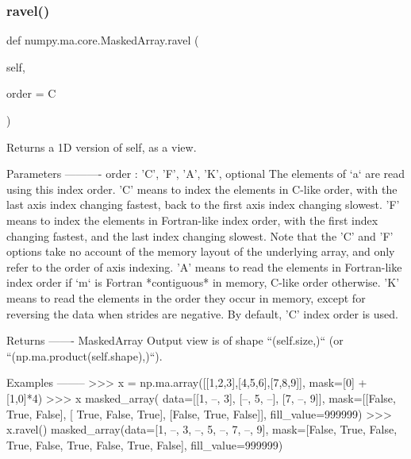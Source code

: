 \subsubsection{\texorpdfstring{ravel()}{ravel()}}
{\footnotesize\ttfamily def numpy.\+ma.\+core.\+Masked\+Array.\+ravel (\begin{DoxyParamCaption}\item[{}]{self,  }\item[{}]{order = {\ttfamily \textquotesingle{}C\textquotesingle{}} }\end{DoxyParamCaption})}

\begin{DoxyVerb}Returns a 1D version of self, as a view.

Parameters
----------
order : {'C', 'F', 'A', 'K'}, optional
    The elements of `a` are read using this index order. 'C' means to
    index the elements in C-like order, with the last axis index
    changing fastest, back to the first axis index changing slowest.
    'F' means to index the elements in Fortran-like index order, with
    the first index changing fastest, and the last index changing
    slowest. Note that the 'C' and 'F' options take no account of the
    memory layout of the underlying array, and only refer to the order
    of axis indexing.  'A' means to read the elements in Fortran-like
    index order if `m` is Fortran *contiguous* in memory, C-like order
    otherwise.  'K' means to read the elements in the order they occur
    in memory, except for reversing the data when strides are negative.
    By default, 'C' index order is used.

Returns
-------
MaskedArray
    Output view is of shape ``(self.size,)`` (or
    ``(np.ma.product(self.shape),)``).

Examples
--------
>>> x = np.ma.array([[1,2,3],[4,5,6],[7,8,9]], mask=[0] + [1,0]*4)
>>> x
masked_array(
  data=[[1, --, 3],
[--, 5, --],
[7, --, 9]],
  mask=[[False,  True, False],
[ True, False,  True],
[False,  True, False]],
  fill_value=999999)
>>> x.ravel()
masked_array(data=[1, --, 3, --, 5, --, 7, --, 9],
     mask=[False,  True, False,  True, False,  True, False,  True,
           False],
       fill_value=999999)\end{DoxyVerb}
 \mbox{\label{classnumpy_1_1ma_1_1core_1_1MaskedArray_a9438d5c4ef1da0b2492579d881ab9813}} 
